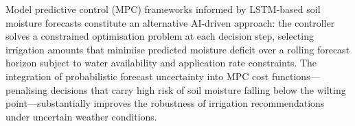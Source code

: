 \documentclass[land,article,submit,pdftex,moreauthors]{Definitions/mdpi}
\numberwithin{equation}{section}
\begin{document}
Model predictive control (MPC) frameworks informed by LSTM-based soil moisture forecasts constitute an alternative AI-driven approach: the controller solves a constrained optimisation problem at each decision step, selecting irrigation amounts that minimise predicted moisture deficit over a rolling forecast horizon subject to water availability and application rate constraints. The integration of probabilistic forecast uncertainty into MPC cost functions---penalising decisions that carry high risk of soil moisture falling below the wilting point---substantially improves the robustness of irrigation recommendations under uncertain weather conditions.

\footnotesize
\setlength{\LTleft}{0pt}
\setlength{\LTright}{0pt}
\end{document}
